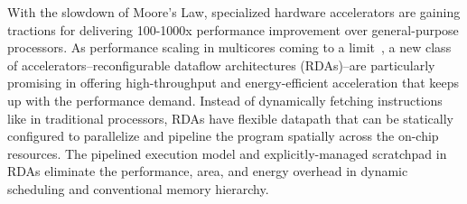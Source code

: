 


With the slowdown of Moore’s Law, specialized hardware accelerators are gaining tractions 
for delivering 100-1000x performance improvement over general-purpose processors. 
As performance scaling in multicores coming to a limit~\cite{multicorescale}, a new
class of accelerators--reconfigurable dataflow architectures (RDAs)--are particularly promising in 
offering high-throughput and energy-efficient acceleration that keeps up with the performance demand.
Instead of dynamically fetching instructions like in traditional processors, RDAs have flexible datapath 
that can be statically configured to parallelize and pipeline the program spatially across
the on-chip resources. 
The pipelined execution model and explicitly-managed scratchpad in RDAs eliminate
the performance, area, and energy overhead in dynamic scheduling and conventional memory hierarchy.

